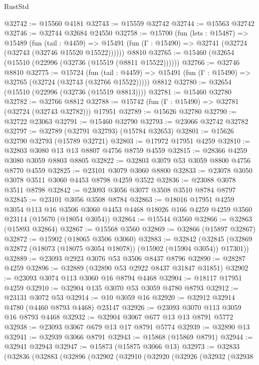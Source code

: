 \begin{lexlean}{RustStd}
\begin{coremodule}
@32742 := @15560 @4181
@32743 := @15559 @32742
@32744 := @15563 @32742
@32746 := @32744 @32684 @24550
@32758 := @15700
    (fun (lets : @15487) =>
    @15489
      (fun (tail : @4459) =>
      @15491 (fun (Γ : @15490) => @32741 (@32724 (@32743 (@32746 @15520 @15522))))))
    @8810
@32765 := @15460 (@32654 (@15510 (@22996 (@32736 (@15519 (@8811 @15522))))))
@32766 := @32746 @8810
@32775 := @15724
    (fun (tail : @4459) => @15491 (fun (Γ : @15490) => @32765 (@32724 (@32743 (@32766 @15522)))))
    @8812
@32780 := @32654 (@15510 (@22996 (@32736 (@15519 @8813))))
@32781 := @15460 @32780
@32782 := @32766 @8812
@32788 := @15742 (fun (Γ : @15490) => @32781 (@32724 (@32743 @32782))) @17951
@32789 := @15626 @32780
@32790 := @32722 @23063
@32791 := @15460 @32790
@32793 := @23066 @32742 @32782
@32797 := @32789 (@32791 @32793) (@15784 @32653)
@32801 := @15626 @32790 @32793 (@15789 @32721)
@32803 := @17972 @17951 @4259
@32810 := @32803 @3080 @13 @13 @8807 @4756 @8759 @4559
@32815 := @28366 @4259 @3080 @3059 @8803 @8805
@32822 := @32803 @3079 @53 @3059 @8800 @4756 @8770 @4559
@32825 := @23101 @3079 @3060 @8800
@32833 := @23078 @3050 @3078 @3511 @3060 @4453 @8798 @4259 @3522
@32836 := @23088 @3078 @3511 @8798
@32842 := @23093 @3056 @3077 @3508 @3510 @8784 @8797
@32845 := @23101 @3056 @3508 @8784
@32863 := @18016
    @17951
    @4259
    @3054
    @113
    @16
    @3506
    @3060
    @4453
    @4468
    @18026
    @166
    @4259
    @4259
    @3560
    @23114
    (@15670 (@18054 @3054))
@32864 := @15544 @3560
@32866 := @32863 (@15893 @32864)
@32867 := @15568 @3560
@32869 := @32866 (@15897 @32867)
@32872 := @15902 (@18065 @3506 @3060)
@32883 := @32842
    (@32845 (@32869 @32872 (@18073 (@18075 @3054 @18078)) (@15902 (@15904 @3054)) @17301))
@32889 := @23093 @2923 @3076 @53 @3506 @8437 @8796
@32890 := @28287 @4259
@32896 := @32889 (@32890 @53 @2922 @8437 @31847 @31851)
@32902 := @23093 @3074 @113 @3060 @16 @8794 @4468
@32904 := @18117 @17951 @4259
@32910 := @32904 @135 @3070 @53 @3059 @4780 @8793
@32912 := @23131 @3072 @53
@32914 := @10 @3059 @16
@32920 := @32912 @32914 @4780 (@4460 @8793 @4468) @23147
@32926 := @23093 @3070 @113 @3059 @16 @8793 @4468
@32932 := @32904 @3067 @677 @13 @13 @8791 @5772
@32938 := @23093 @3067 @679 @13 @17 @8791 @5774
@32939 := @32890 @13
@32941 := @32939 @3066 @8791
@32943 := @15868 (@15869 @8791)
@32944 := @32941 @32943
@32947 := @15873 (@15875 @3066 @13)
@32973 := @32833
    (@32836
      (@32883
        (@32896
          (@32902
            (@32910
              (@32920
                (@32926
                  (@32932
                    (@32938

\end{coremodule}
\end{lexlean}

